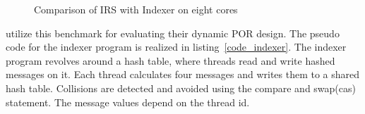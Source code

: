 {\begin{figure}[h]
     \centering
     \caption{Comparison of IRS with Indexer on eight cores}
\end{figure}

\citet{dynamic_por} utilize this benchmark for evaluating their dynamic POR design. 
The pseudo code for the indexer program is realized in listing~\ref{code_indexer}.  
The indexer program revolves around a hash table, where threads read and write hashed messages on it. 
Each thread calculates four messages and writes them to a shared hash table. 
Collisions are detected and avoided using the compare and swap(cas) statement. 
The message values depend on the thread id. 

}
